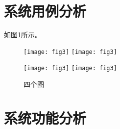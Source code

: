 \section{系统用例分析}

如图\ref{fig:fourimg}所示。

\begin{figure}[H]
	\centering
    \texttt{[image: fig3]}
    \quad 
	\texttt{[image: fig3]} 

	\vspace{1ex} 
	\texttt{[image: fig3]}
	\quad
	\texttt{[image: fig3]}
	\caption{四个图}
	\label{fig:fourimg}
\end{figure}

\section{系统功能分析}





